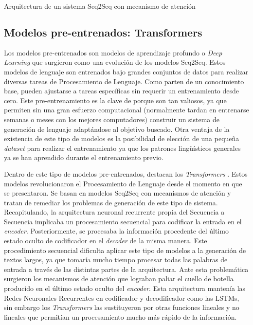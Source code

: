 %
{Arquitectura de un sistema Seq2Seq con mecanismo de atención}


\subsection{Modelos pre-entrenados: Transformers}
\label{sec:transformers}
Los modelos pre-entrenados son modelos de aprendizaje profundo o \textit{Deep Learning} que surgieron como una evolución de los modelos Seq2Seq. Estos modelos de lenguaje son entrenados bajo grandes conjuntos de datos para realizar diversas tareas de Procesamiento de Lenguaje. Como parten de un conocimiento base, pueden ajustarse a tareas específicas sin requerir un entrenamiento desde cero. Este pre-entrenamiento es la clave de porque son tan valiosos, ya que permiten sin una gran esfuerzo computacional (normalmente tardan en entrenarse semanas o meses con los mejores computadores) construir un sistema de generación de lenguaje adaptándose al objetivo buscado. Otra ventaja de la existencia de este tipo de modelos es la posibilidad de elección de una pequeña \textit{dataset} para realizar el entrenamiento ya que los patrones lingüísticos generales ya se han aprendido durante el entrenamiento previo.



Dentro de este tipo de modelos pre-entrenados, destacan los \textit{Transformers} \citep{vaswani2017attention}. Estos modelos revolucionaron el Procesamiento de Lenguaje desde el momento en que se presentaron. Se basan en modelos Seq2Seq con mecanismos de atención y tratan de remediar los problemas de generación de este tipo de sistema. Recapitulando, la arquitectura neuronal recurrente propia del Secuencia a Secuencia implicaba un procesamiento secuencial para codificar la entrada en el \textit{encoder}. Posteriormente, se procesaba la información procedente del último estado oculto de codificador en el \textit{decoder} de la misma manera. Este procedimiento secuencial dificulta aplicar este tipo de modelos a la generación de textos largos, ya que tomaría mucho tiempo procesar todas las palabras de entrada a través de las distintas partes de la arquitectura. Ante esta problemática surgieron los mecanismos de atención que lograban paliar el cuello de botella producido en el último estado oculto del \textit{encoder}. Esta arquitectura mantenía las Redes Neuronales Recurrentes en codificador y decodificador como las LSTMs, sin embargo los \textit{Transformers} las sustituyeron por otras funciones lineales y no lineales que permitían un procesamiento mucho más rápido de la información.



